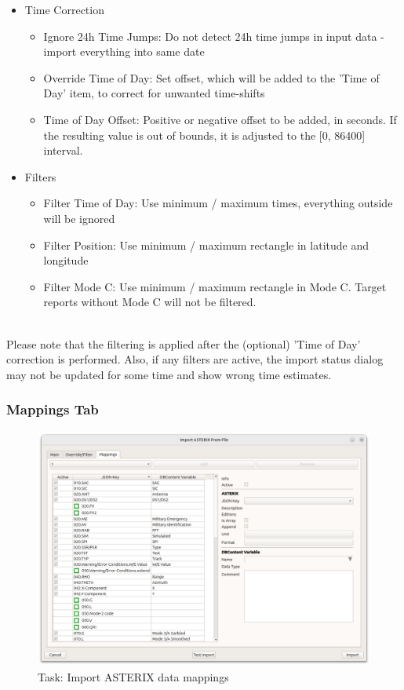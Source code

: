 \begin{itemize}
\item Time Correction
\begin{itemize}
\item Ignore 24h Time Jumps: Do not detect 24h time jumps in input data - import everything into same date
\item Override Time of Day: Set offset, which will be added to the 'Time of Day'  item, to correct for unwanted time-shifts
\item Time of Day Offset: Positive or negative offset to be added, in seconds. If the resulting value is out of bounds, it is adjusted to the [0, 86400] interval.
\end{itemize}
\item Filters
\begin{itemize}
\item Filter Time of Day: Use minimum / maximum times, everything outside will be ignored
\item Filter Position: Use minimum / maximum rectangle in latitude and longitude
\item Filter Mode C: Use minimum / maximum rectangle in Mode C. Target reports without Mode C will not be filtered.
\end{itemize}
\end{itemize}
\ \\

Please note that the filtering is applied after the (optional) 'Time of Day' correction is performed. Also, if any filters are active, the import status dialog may not be updated for some time and show wrong time estimates.

\subsubsection{Mappings Tab}

\begin{figure}[H]
  \center
    \hspace*{-0.5cm}
    \includegraphics[width=17cm]{figures/asterix_import_data_mappings.png}
  \caption{Task: Import ASTERIX data mappings}
\end{figure}

